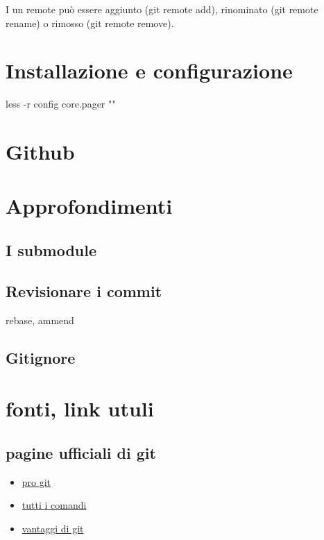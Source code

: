 \documentclass{article} \usepackage[textwidth=19cm,textheight=24cm]{geometry}
\begin{document}
I un remote può essere aggiunto (git remote add), rinominato (git remote rename)
o rimosso (git remote remove).

\section{Installazione e configurazione\label{configurazione}}

less -r 
config core.pager ""

\section{Github}

\section{Approfondimenti}

\subsection{I submodule}

\subsection{Revisionare i commit}

rebase, ammend

\subsection{Gitignore}

\section{fonti, link utuli}

\subsection{pagine ufficiali di git}
\begin{itemize}
    \item \href{https://git-scm.com/book/en/v2}{pro git}
    \item \href{https://git-scm.com/doc}{tutti i comandi}
    \item \href{https://git-scm.com/about/branching-and-merging}{vantaggi di git}
\end{itemize}
\end{document}
